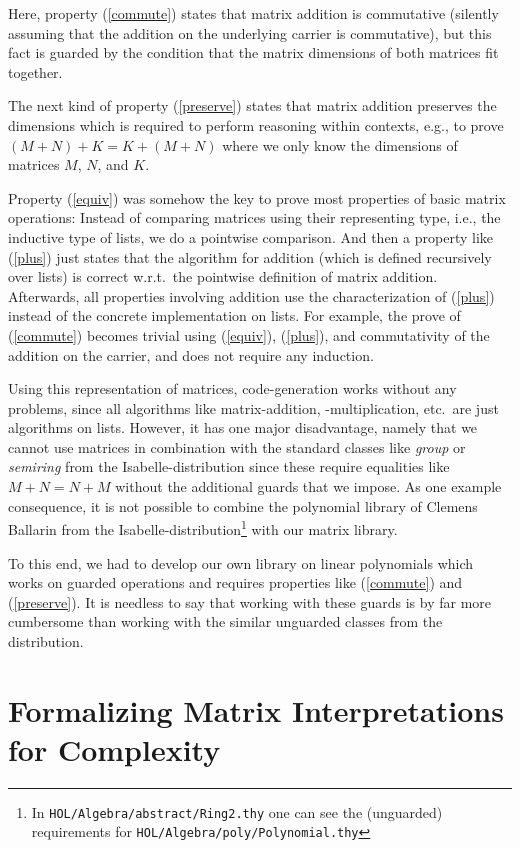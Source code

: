 \documentclass[a4paper]{llncs}
\newcommand{\rSub}[1]{(\ref{#1})}
\begin{document}
Here, property \rSub{commute} states that matrix addition is commutative
(silently assuming that the addition on the underlying carrier is commutative),
but this fact is guarded by the condition that the matrix dimensions of both matrices fit together.

The next kind of property \rSub{preserve} states that matrix addition preserves
the dimensions which is required to perform reasoning within contexts, e.g.,
to prove $(M + N) + K = K + (M + N)$ where we only know the dimensions of
matrices $M$, $N$, and $K$.

Property \rSub{equiv} was somehow the key to prove most properties of basic matrix
operations: Instead of comparing matrices using their representing type, i.e., the
inductive type of lists, we do a pointwise comparison. And then a property
like \rSub{plus} 
just states that the algorithm for addition (which is defined recursively over lists) is correct 
w.r.t.\ the pointwise definition of matrix addition. Afterwards, all properties
involving addition use the characterization of \rSub{plus} instead of the concrete implementation on lists.
For example, the prove of \rSub{commute} becomes trivial using \rSub{equiv},
\rSub{plus}, and commutativity of the addition on the carrier, and does not
require any induction.

Using this representation of matrices, code-generation works without any
problems, since all algorithms like matrix-addition, -multiplication, etc.\ are
just algorithms on lists.
However, it has one major disadvantage, namely that we cannot use matrices
in combination with the standard
classes like \emph{group} or \emph{semiring} from the Isabelle-distribution since
these require equalities like $M + N = N + M$ without the additional guards
that we impose. As one example consequence, it is not possible to combine the polynomial library of Clemens Ballarin
from the Isabelle-distribution\footnote{In
\texttt{HOL/Algebra/abstract/Ring2.thy} one can see the (unguarded) requirements for \texttt{HOL/Algebra/poly/Polynomial.thy}} with our matrix library.

To this end, we had to develop our own library on linear polynomials
which works on guarded operations and requires properties like \rSub{commute}
and \rSub{preserve}. It is needless to say that working with these guards
is by far more cumbersome than working with the similar unguarded classes 
from the distribution. 



\section{Formalizing Matrix Interpretations for Complexity}
\label{complexity}
\end{document}
